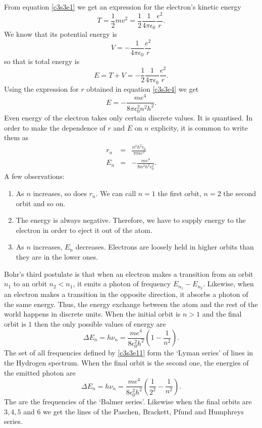 From equation \eqref{c3s3e1} we get an expression for the electron's kinetic
energy
\begin{equation}\label{c3s3e5}
T = \frac{1}{2}mv^2 = \frac{1}{2}\frac{1}{4\pi\epsilon_0}\frac{e^2}{r}.
\end{equation}
We know that its potential energy is
\begin{equation}\label{c3s3e6}
V = -\frac{1}{4\pi\epsilon_0}\frac{e^2}{r}
\end{equation}
so that is total energy is
\begin{equation}\label{c3s3e7}
E = T + V = -\frac{1}{2}\frac{1}{4\pi\epsilon_0}\frac{e^2}{r}.
\end{equation}
Using the expression for $r$ obtained in equation \eqref{c3s3e4} we get
\begin{equation}\label{c3s3e8}
E = -\frac{me^4}{8\pi\epsilon_0^2 n^2h^2}.
\end{equation}
Even energy of the electron takes only certain discrete values. It is quantised.
In order to make the dependence of $r$ and $E$ on $n$ explicity, it is common to
write them as
\begin{eqnarray}
r_n &=& \frac{n^2 h^2 \epsilon_0}{\pi me^2} \label{c3s3e9} \\
E_n &=& -\frac{me^4}{8 n^2h^2\epsilon_0^2}. \label{c3s3e10}
\end{eqnarray}
A few observations:
\begin{enumerate}
\item As $n$ increases, so does $r_n$. We can call $n = 1$ the first orbit, 
$n = 2$ the second orbit and so on.
\item The energy is always negative. Therefore, we have to supply energy to the
electron in order to eject it out of the atom.
\item As $n$ increases, $E_n$ decreases. Electrons are loosely held in higher 
orbits than they are in the lower ones.
\end{enumerate}
Bohr's third postulate is that when an electron makes a transition from an orbit
$n_1$ to an orbit $n_2 < n_1$, it emits a photon of frequency $E_{n_1}-E_{n_2}$.
Likewise, when an electron makes a transition in the opposite direction, it 
absorbs a photon of the same energy. Thus, the energy exchange between the atom
and the rest of the world happens in discrete units. When the initial orbit is
$n > 1$ and the final orbit is $1$ then the only possible values of energy are
\begin{equation}\label{c3s3e11}
\Delta E_n=h\nu_n =\frac{me^4}{8\epsilon_0^2h^2}\left(1 - \frac{1}{n^2}\right).
\end{equation}
The set of all frequencies defined by \eqref{c3s3e11} form the `Lyman series' of
lines in the Hydrogen spectrum. When the final orbit is the second one, the 
energies of the emitted photon are
\begin{equation}\label{c3s3e12}
\Delta E_n = h\nu_n =
\frac{me^4}{8\epsilon_0^2h^2}\left(\frac{1}{2^2} - \frac{1}{n^2}\right).
\end{equation}
The are the frequencies of the `Balmer series'. Likewise when the final orbits 
are $3, 4, 5$ and $6$ we get the lines of the Paschen, Brackett, Pfund and 
Humphreys series.

